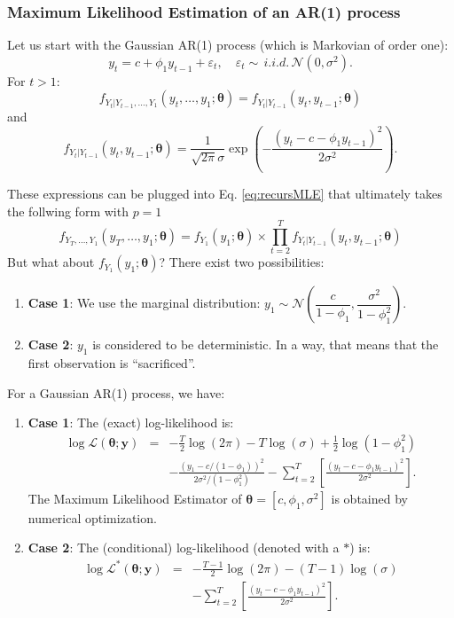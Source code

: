 \documentclass[
  11pt,
]{book}
\providecommand{\tightlist}{%
  \setlength{\itemsep}{0pt}\setlength{\parskip}{0pt}}
\theoremstyle{definition}
\theoremstyle{definition}
\theoremstyle{definition}
\theoremstyle{definition}
\theoremstyle{remark}
\begin{document}
\subsubsection{Maximum Likelihood Estimation of an AR(1) process}\label{estimAR1}

Let us start with the Gaussian AR(1) process (which is Markovian of order one):
\[
y_t = c + \phi_1 y_{t-1} + \varepsilon_t, \quad \varepsilon_t \sim\,i.i.d.\, \mathcal{N}(0,\sigma^2).
\]
For \(t>1\):
\[
f_{Y_t|Y_{t-1},\dots,Y_1}(y_t,\dots,y_1;\boldsymbol\theta) = f_{Y_t|Y_{t-1}}(y_t,y_{t-1};\boldsymbol\theta)
\]
and
\[
f_{Y_t|Y_{t-1}}(y_t,y_{t-1};\boldsymbol\theta) = \frac{1}{\sqrt{2\pi}\sigma}\exp\left(-\frac{(y_t - c - \phi_1 y_{t-1})^2}{2\sigma^2}\right).
\]

These expressions can be plugged into Eq. \eqref{eq:recursMLE} that ultimately takes the follwing form with \(p=1\)
\[
f_{Y_T,\dots,Y_1}(y_T,\dots,y_1;\boldsymbol\theta) = f_{Y_1}(y_1;\boldsymbol\theta) \times \prod_{t=2}^{T} f_{Y_t|Y_{t-1}}(y_t,y_{t-1};\boldsymbol\theta)
\]
But what about \(f_{Y_1}(y_1;\boldsymbol\theta)\)? There exist two possibilities:

\begin{enumerate}
\def\labelenumi{\arabic{enumi}.}
\tightlist
\item
  \textbf{Case 1}: We use the marginal distribution: \(y_1 \sim \mathcal{N}\left(\dfrac{c}{1-\phi_1},\dfrac{\sigma^2}{1-\phi_1^2}\right)\).
\item
  \textbf{Case 2}: \(y_1\) is considered to be deterministic. In a way, that means that the first observation is ``sacrificed''.
\end{enumerate}

For a Gaussian AR(1) process, we have:

\begin{enumerate}
\def\labelenumi{\arabic{enumi}.}
\item
  \textbf{Case 1}: The (exact) log-likelihood is:
  \begin{eqnarray}
  \log \mathcal{L}(\boldsymbol\theta;\mathbf{y})  &=& - \frac{T}{2} \log(2\pi) - T\log(\sigma) + \frac{1}{2}\log(1-\phi_1^2)\nonumber \\
  && - \frac{(y_1 - c/(1-\phi_1))^2}{2\sigma^2/(1-\phi_1^2)} - \sum_{t=2}^T \left[\frac{(y_t - c - \phi_1 y_{t-1})^2}{2\sigma^2} \right].
  \end{eqnarray}
  The Maximum Likelihood Estimator of \(\boldsymbol\theta= [c,\phi_1,\sigma^2]\) is obtained by numerical optimization.
\item
  \textbf{Case 2}: The (conditional) log-likelihood (denoted with a \(*\)) is:
  \begin{eqnarray}
  \log \mathcal{L}^*(\boldsymbol\theta;\mathbf{y})  &=& - \frac{T-1}{2} \log(2\pi) - (T-1)\log(\sigma)\nonumber\\
  && - \sum_{t=2}^T \left[\frac{(y_t - c - \phi_1 y_{t-1})^2}{2\sigma^2} \right].\label{eq:Lstar}
  \end{eqnarray}
\end{enumerate}
\end{document}
